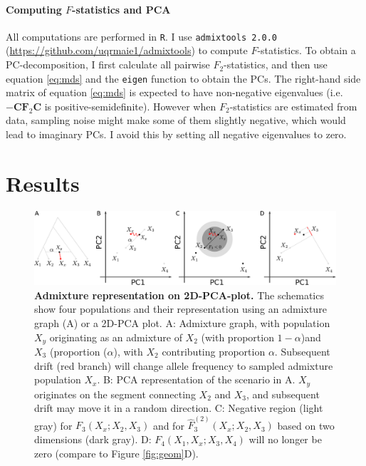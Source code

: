 \documentclass[12pt,fullpage, a4paper]{article}
\newcommand{\MC}{\mathbf{C}} %
\newcommand{\MF}{\mathbf{F}_2} %
\begin{document}
\paragraph{Computing $F$-statistics and PCA}
All computations are performed in \texttt{R}. I use \texttt{admixtools 2.0.0} (\url{https://github.com/uqrmaie1/admixtools}) to compute $F$-statistics. To obtain a PC-decomposition, I first calculate all pairwise $F_2$-statistics, and then use equation \ref{eq:mds} and the \texttt{eigen} function to obtain the PCs. The right-hand side matrix of equation \ref{eq:mds} is expected to have non-negative eigenvalues (i.e. $-\MC\MF\MC$ is positive-semidefinite). However when $F_2$-statistics are estimated from data, sampling noise might make some of them  slightly negative, which would lead to imaginary PCs. I avoid this by setting all negative eigenvalues to zero.

\section{Results}



\begin{figure}[!ht]
	\includegraphics[width=\textwidth]{figures/fstats_admixture_pca.pdf}
	\caption{\textbf{Admixture representation on 2D-PCA-plot.} The schematics show four populations and their representation using an admixture graph (A) or a 2D-PCA plot. A: Admixture graph, with population $X_y$ originating as an admixture of $X_2$ (with proportion $1-\alpha$)and $X_3$ (proportion ($\alpha$), with $X_2$ contributing proportion $\alpha$. Subsequent drift (red branch) will change allele frequency to sampled admixture population $X_x$. B: PCA representation of the scenario in A. $X_y$ originates on the segment connecting $X_2$ and $X_3$, and subsequent drift may move it in a random direction. C: Negative region (light gray) for $F_3(X_x; X_2, X_3)$ and for $\hat{F}_3^{(2)}(X_x; X_2, X_3)$ based on two dimensions (dark gray). D: $F_4(X_1, X_x; X_3, X_4)$ will no longer be zero (compare to Figure \ref{fig:geom}D). }
	\label{fig:admix}
\end{figure}
\end{document}

